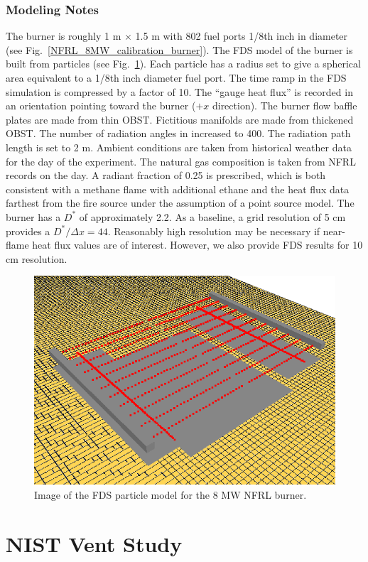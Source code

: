 \subsubsection{Modeling Notes}

The burner is roughly 1 m $\times$ 1.5 m with 802 fuel ports 1/8th inch in diameter (see Fig.~\ref{NFRL_8MW_calibration_burner}).  The FDS model of the burner is built from particles (see Fig.~\ref{FDS_NFRL_8MW_particle_burner}).  Each particle has a radius set to give a spherical area equivalent to a 1/8th inch diameter fuel port.  The time ramp in the FDS simulation is compressed by a factor of 10.  The ``gauge heat flux'' is recorded in an orientation pointing toward the burner ($+x$ direction).  The burner flow baffle plates are made from thin {\ct OBST}.  Fictitious manifolds are made from thickened {\ct OBST}.  The number of radiation angles in increased to 400.  The radiation path length is set to 2 m.  Ambient conditions are taken from historical weather data for the day of the experiment.  The natural gas composition is taken from NFRL records on the day.  A radiant fraction of 0.25 is prescribed, which is both consistent with a methane flame with additional ethane and the heat flux data farthest from the fire source under the assumption of a point source model.  The burner has a $D^*$ of approximately 2.2.  As a baseline, a grid resolution of 5 cm provides a $D^*/\Delta x = 44$.  Reasonably high resolution may be necessary if near-flame heat flux values are of interest.  However, we also provide FDS results for 10 cm resolution.

\begin{figure}[h]
\centering
\includegraphics[width=.5\textwidth]{FIGURES/NIST_Structure_Separation/nfrl_burner_particles}
\caption[FDS particle model of NFRL 8 MW burner]{Image of the FDS particle model for the 8 MW NFRL burner.}
\label{FDS_NFRL_8MW_particle_burner}
\end{figure}


\section{NIST Vent Study}
\label{NIST_Vent_Description}


